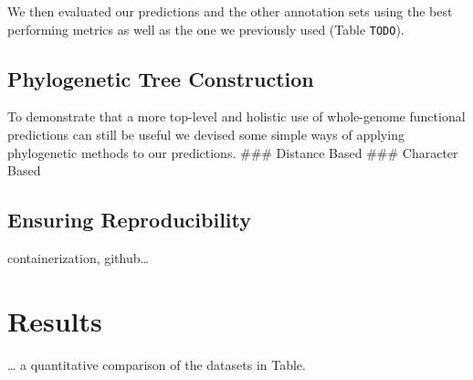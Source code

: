 \documentclass[utf8]{frontiersSCNS}
\begin{document}
We then evaluated our predictions and the other annotation sets using the best performing metrics as well as the one we previously used (Table \texttt{TODO}).

\hypertarget{phylogenetic-tree-construction}{%
\subsection{Phylogenetic Tree Construction}\label{phylogenetic-tree-construction}}

To demonstrate that a more top-level and holistic use of whole-genome functional predictions can still be useful we devised some simple ways of applying phylogenetic methods to our predictions.
\#\#\# Distance Based
\#\#\# Character Based

\hypertarget{ensuring-reproducibility}{%
\subsection{Ensuring Reproducibility}\label{ensuring-reproducibility}}

containerization, github\ldots{}

\hypertarget{results}{%
\section{Results}\label{results}}

\ldots{} a quantitative comparison of the datasets in Table.
\end{document}
